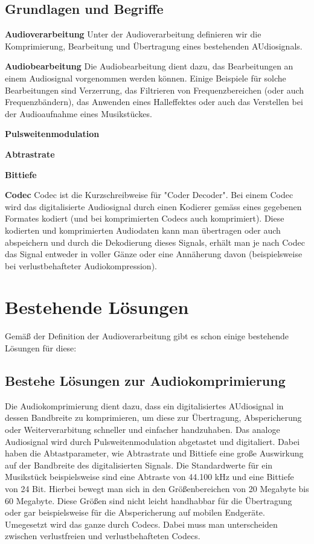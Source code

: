 \documentclass[paper=a4,fontsize=12pt,ngerman]{scrartcl}
\begin{document}
\subsection{Grundlagen und Begriffe}
\textbf{Audioverarbeitung}
Unter der Audioverarbeitung definieren wir die Komprimierung, Bearbeitung und Übertragung eines bestehenden AUdiosignals.

\textbf{Audiobearbeitung}
Die Audiobearbeitung dient dazu, das Bearbeitungen an einem Audiosignal vorgenommen werden können.
Einige Beispiele für solche Bearbeitungen sind Verzerrung, das Filtrieren von Frequenzbereichen (oder auch Frequenzbändern), das Anwenden eines Halleffektes oder auch das Verstellen bei der Audioaufnahme eines Musikstückes.

\textbf{Pulsweitenmodulation}

\textbf{Abtrastrate}

\textbf{Bittiefe}

\textbf{Codec}
Codec ist die Kurzschreibweise für "Coder Decoder". 
Bei einem Codec wird das digitalisierte Audiosignal durch einen Kodierer gemäss eines gegebenen Formates kodiert (und bei komprimierten Codecs auch komprimiert). 
Diese kodierten und komprimierten Audiodaten kann man übertragen oder auch abspeichern und durch die Dekodierung dieses Signals, erhält man je nach Codec das Signal entweder in voller Gänze oder eine Annäherung davon (beispielsweise bei verlustbehafteter Audiokompression).

\label{BL}
\section{Bestehende Lösungen}
Gemäß der Definition der Audioverarbeitung gibt es schon einige bestehende Lösungen für diese:

\subsection{Bestehe Lösungen zur Audiokomprimierung}
Die Audiokomprimierung dient dazu, dass ein digitalisiertes AUdiosignal in dessen Bandbreite zu komprimieren, um diese zur Übertragung, Abspericherung oder Weiterverarbitung schneller und einfacher handzuhaben. 
Das analoge Audiosignal wird durch Pulsweitenmodulation abgetastet und digitaliert. 
Dabei haben die Abtastparameter, wie Abtrastrate und Bittiefe eine große Auswirkung auf der Bandbreite des digitalisierten Signals.
Die Standardwerte für ein Musikstück beispielsweise sind eine Abtraste von 44.100 kHz und eine Bittiefe von 24 Bit. 
Hierbei bewegt man sich in den Größenbereichen von 20 Megabyte bis 60 Megabyte. 
Diese Größen sind nicht leicht handhabbar für die Übertragung oder gar beispielsweise für die Abspericherung auf mobilen Endgeräte.
Umegesetzt wird das ganze durch Codecs. Dabei muss man unterscheiden zwischen verlustfreien und verlustbehafteten Codecs.
\end{document}
